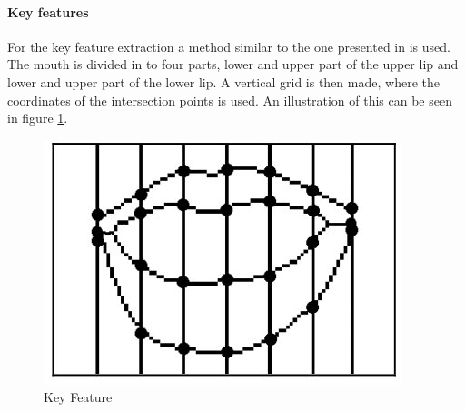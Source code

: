 \paragraph{Key features}
For the key feature extraction a method similar to the one presented in \cite{Li2008} is used.
The mouth is divided in to four parts, lower and upper part of the upper lip and lower and upper part of the lower lip.
A vertical grid is then made, where the coordinates of the intersection points is used.
An illustration of this can be seen in figure \ref{fig:keyFeature}.
\begin{figure}[h]
    \centering
    \includegraphics[width=0.5\columnwidth]{fig/keyFeature.jpg}
    \caption{Key Feature}
    \label{fig:keyFeature}
\end{figure}



%
%
%
%
%
%
